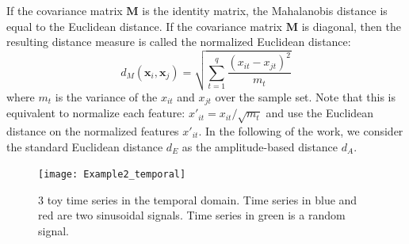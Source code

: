 If the covariance matrix $\textbf{M}$ is the identity matrix, the Mahalanobis distance is equal to the Euclidean distance. If the covariance matrix $\textbf{M}$ is diagonal, then the resulting distance measure is called the normalized Euclidean distance:
\begin{equation}	
d_M(\textbf{x}_i,\textbf{x}_j) = \sqrt{\sum\limits_{t=1}^{q}\frac{(x_{it}-x_{jt})^2}{m_t}}
\label{eq:dM2}
\end{equation}
\noindent where $m_t$ is the variance of the $x_{it}$ and $x_{jt}$ over the sample set. Note that this is equivalent to normalize each feature: $x'_{it} = x_{it}/\sqrt{m_t}$ and use the Euclidean distance on the normalized features $x'_{it}$.
In the following of the work, we consider the standard Euclidean distance $d_E$ as the amplitude-based distance $d_A$.

\begin{figure}[h!]
\centering
\texttt{[image: Example2\_temporal]}
\caption[3 toy time series in the temporal domain.]{3 toy time series in the temporal domain. Time series in blue and red are two sinusoidal signals. Time series in green is a random signal.}
\label{fig:ExampleTimeSeriesMetrics3}
\end{figure}


